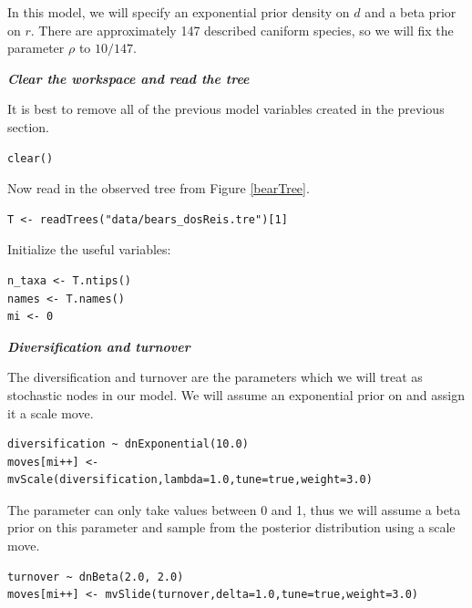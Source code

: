 In this model, we will specify an exponential prior density on $d$ and a beta prior on $r$.
There are approximately 147 described caniform species, so we will fix the parameter $\rho$ to $10/147$.



\textbf{\textit{Clear the workspace and read the tree}}

It is best to remove all of the previous model variables created in the previous section.
{\tt \begin{snugshade*}
\begin{lstlisting}
clear()
\end{lstlisting}
\end{snugshade*}}

Now read in the observed tree from Figure \ref{bearTree}. 
{\tt \begin{snugshade*}
\begin{lstlisting}
T <- readTrees("data/bears_dosReis.tre")[1]
\end{lstlisting}
\end{snugshade*}}

Initialize the useful variables:
{\tt \begin{snugshade*}
\begin{lstlisting}
n_taxa <- T.ntips()
names <- T.names()
mi <- 0 
\end{lstlisting}
\end{snugshade*}}

\textbf{\textit{Diversification and turnover}}

The diversification and turnover are the parameters which we will treat as stochastic nodes in our model. 
We will assume an exponential prior on  and assign it a scale move.
{\tt \begin{snugshade*}
\begin{lstlisting}
diversification ~ dnExponential(10.0) 
moves[mi++] <- mvScale(diversification,lambda=1.0,tune=true,weight=3.0) 
\end{lstlisting}
\end{snugshade*}}

The  parameter can only take values between 0 and 1, thus we will assume a beta prior on this parameter and sample from the posterior distribution using a scale move.
{\tt \begin{snugshade*}
\begin{lstlisting}
turnover ~ dnBeta(2.0, 2.0) 
moves[mi++] <- mvSlide(turnover,delta=1.0,tune=true,weight=3.0)
\end{lstlisting}
\end{snugshade*}}

